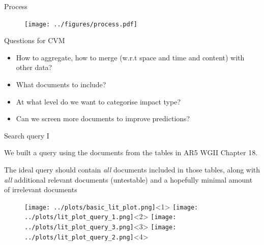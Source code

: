 \documentclass[9pt]{beamer}
\begin{document}
\begin{frame}{Process}
\begin{figure}
	\texttt{[image: ../figures/process.pdf]}
\end{figure}
\end{frame}

\begin{frame}{Questions for CVM}
\large
\begin{itemize}
	\item How to aggregate, how to merge (w.r.t space and time and content) with other data?
	\item What documents to include?
	\item At what level do we want to categorise impact type?
	\item Can we screen more documents to improve predictions?
\end{itemize}
\end{frame}

\begin{frame}{Search query I}

We built a query using the documents from the tables in AR5 WGII Chapter 18.

The ideal query should contain \textit{all} documents included in those tables, along with \textit{all} additional relevant documents (untestable) and a hopefully minimal amount of irrelevant documents

\begin{figure}
	\texttt{[image: ../plots/basic\_lit\_plot.png]}<1>
	\texttt{[image: ../plots/lit\_plot\_query\_1.png]}<2>
	\texttt{[image: ../plots/lit\_plot\_query\_3.png]}<3>
	\texttt{[image: ../plots/lit\_plot\_query\_2.png]}<4>
\end{figure}
\end{frame}
\end{document}
